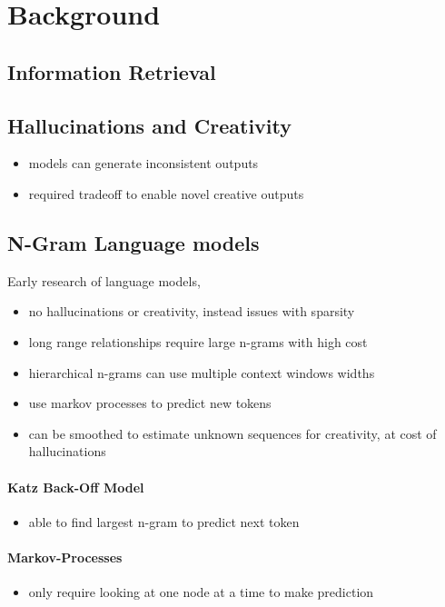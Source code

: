 \section{Background}

\subsection{Information Retrieval}

\subsection{Hallucinations and Creativity}
\begin{itemize}
    \item models can generate inconsistent outputs
    \item required tradeoff to enable novel creative outputs
\end{itemize}

\subsection{N-Gram Language models}
Early research of language models, 
\begin{itemize}
    \item no hallucinations or creativity, instead issues with sparsity
    \item long range relationships require large n-grams with high cost
    \item hierarchical n-grams can use multiple context windows widths
    \item use markov processes to predict new tokens
    \item can be smoothed to estimate unknown sequences for creativity, at cost of hallucinations
\end{itemize}
\paragraph{Katz Back-Off Model}
\begin{itemize}
    \item able to find largest n-gram to predict next token
\end{itemize}
\paragraph{Markov-Processes}
\begin{itemize}
    \item only require looking at one node at a time to make prediction
\end{itemize}
